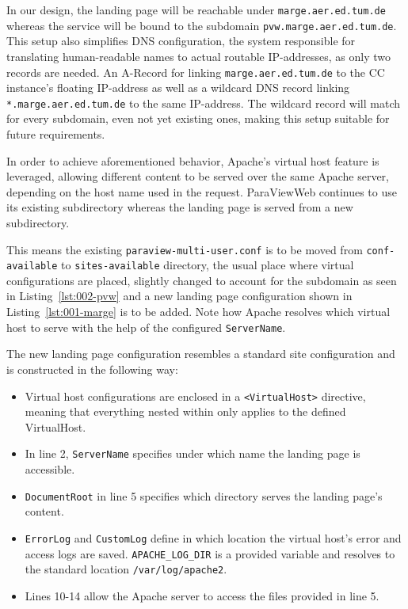 In our design, the landing page will be reachable under
\texttt{marge.aer.ed.tum.de} whereas the service will be bound to the subdomain
\texttt{pvw.marge.aer.ed.tum.de}. This setup also simplifies DNS configuration,
the system responsible for translating human-readable names to actual routable
IP-addresses, as only two records are needed. An A-Record for linking
\texttt{marge.aer.ed.tum.de} to the CC instance's floating IP-address as well as
a wildcard DNS record linking \texttt{*.marge.aer.ed.tum.de} to the same
IP-address. The wildcard record will match for every subdomain, even not yet
existing ones, making this setup suitable for future requirements. 

In order to achieve aforementioned behavior, Apache's virtual host feature is
leveraged, allowing different content to be served over the same Apache server,
depending on the host name used in the request. ParaViewWeb continues to use its
existing subdirectory whereas the landing page is served from a new
subdirectory.

This means the existing \texttt{paraview-multi-user.conf} is to be moved from
\texttt{conf-available} to \texttt{sites-available} directory, the usual place
where virtual configurations are placed, slightly changed to account for the
subdomain as seen in Listing~\ref{lst:002-pvw} and a new landing page
configuration shown in Listing~\ref{lst:001-marge} is to be added. Note how
Apache resolves which virtual host to serve with the help of the configured
\texttt{ServerName}.

The new landing page configuration resembles a standard site configuration and
is constructed in the following way:
\begin{itemize}
    \item Virtual host configurations are enclosed in a \texttt{<VirtualHost>}
    directive, meaning that everything nested within only applies to the defined
    VirtualHost.
    \item In line 2, \texttt{ServerName} specifies under which name the
    landing page is accessible.
    \item \texttt {DocumentRoot} in line 5 specifies which directory serves
    the landing page's content.
    \item \texttt{ErrorLog} and \texttt{CustomLog} define in which
    location the virtual host's error and access logs are saved.
    \texttt{APACHE\_LOG\_DIR} is a provided variable and resolves to the
    standard location \texttt{/var/log/apache2}.
    \item Lines 10-14 allow the Apache server to access the files provided in
    line 5.
\end{itemize}

